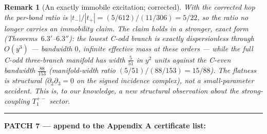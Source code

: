 \documentclass[11pt]{article}
\newtheorem{remark}[theorem]{Remark}
\begin{document}
\begin{remark}[An exactly immobile excitation; corrected]\label{rem:64corr}
With the corrected hop the per-bond ratio is
$|t_-|/|t_+|=(5/612)/(11/306)=5/22$, so the ratio no longer carries an
immobility claim. The claim holds in a stronger, exact form
(Theorems~$6.3'$--$6.3''$): the lowest C-odd branch is \emph{exactly
dispersionless} through $O(y^3)$ --- bandwidth $0$, infinite effective mass
at these orders --- while the full C-odd three-branch manifold has width
$\tfrac{5}{51}$ in $y^2$ units against the C-even bandwidth
$\tfrac{88}{153}$ (manifold-width ratio
$(5/51)/(88/153)=15/88$). The flatness is structural
($\partial_2\partial_3=0$ on the signed incidence complex), not a
small-parameter accident. This is, to our knowledge, a new structural
observation about the strong-coupling $T_1^{+-}$ sector.
\end{remark}


\medskip\hrule\medskip
\noindent\textbf{PATCH 7 --- append to the Appendix A certificate list:}
\end{document}
